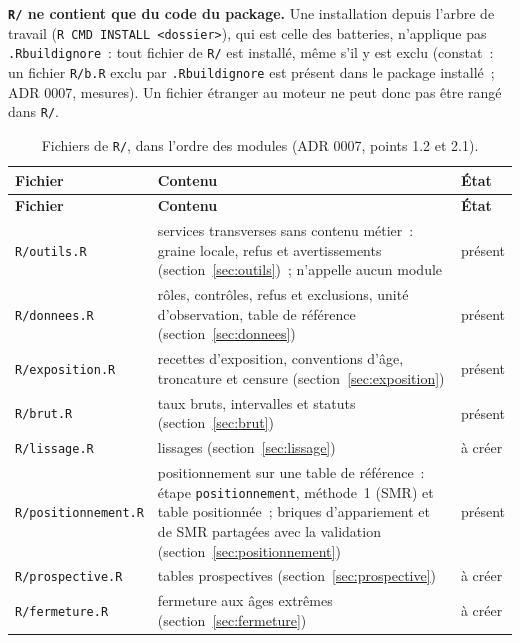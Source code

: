 \documentclass[a4paper,11pt]{article}
\newcommand{\code}[1]{\texttt{\small #1}}
\begin{document}
\medskip
\textbf{\code{R/} ne contient que du code du package.} Une installation depuis
l'arbre de travail (\code{R CMD INSTALL <dossier>}), qui est celle des
batteries, n'applique pas \code{.Rbuildignore}~: tout fichier de \code{R/} est
installé, même s'il y est exclu (constat~: un fichier \code{R/b.R} exclu par
\code{.Rbuildignore} est présent dans le package installé~; ADR 0007, mesures).
Un fichier étranger au moteur ne peut donc pas être rangé dans \code{R/}.

\begin{center}
\small
{}
\begin{longtable}{@{}p{4.2cm}p{7.6cm}p{2.9cm}@{}}
\caption{Fichiers de \code{R/}, dans l'ordre des modules (ADR 0007, points 1.2 et 2.1).}
\label{tab:fichiers-r}\\
\rowcolor{tableheader}
\textcolor{financeblue}{\textbf{Fichier}} &
\textcolor{financeblue}{\textbf{Contenu}} &
\textcolor{financeblue}{\textbf{État}} \\
\endfirsthead
\rowcolor{tableheader}
\textcolor{financeblue}{\textbf{Fichier}} &
\textcolor{financeblue}{\textbf{Contenu}} &
\textcolor{financeblue}{\textbf{État}} \\
\endhead
\code{R/outils.R} & services transverses sans contenu métier~: graine locale,
refus et avertissements (section~\ref{sec:outils})~; n'appelle aucun module &
présent \\
\code{R/donnees.R} & rôles, contrôles, refus et exclusions, unité
d'observation, table de référence (section~\ref{sec:donnees}) & présent \\
\code{R/exposition.R} & recettes d'exposition, conventions d'âge, troncature
et censure (section~\ref{sec:exposition}) & présent \\
\code{R/brut.R} & taux bruts, intervalles et statuts (section~\ref{sec:brut}) & présent \\
\code{R/lissage.R} & lissages (section~\ref{sec:lissage}) & à créer \\
\code{R/positionnement.R} & positionnement sur une table de référence~:
étape \code{positionnement}, méthode~1 (SMR) et table positionnée~; briques
d'appariement et de SMR partagées avec la validation
(section~\ref{sec:positionnement}) & présent \\
\code{R/prospective.R} & tables prospectives (section~\ref{sec:prospective}) & à créer \\
\code{R/fermeture.R} & fermeture aux âges extrêmes (section~\ref{sec:fermeture}) & à créer \\

\end{longtable}
\end{center}
\end{document}
